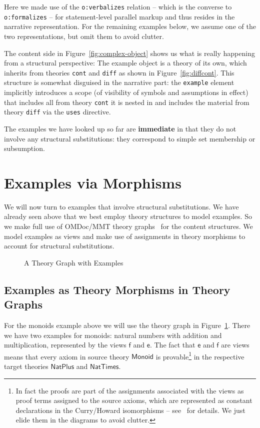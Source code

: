 \documentclass[11pt]{bluenote}
\def\cn#1{\mathsf{#1}}
\def\omdoc{OMDoc\xspace}
\def\omdoc{OMDoc\xspace}
\def\defemph{\textbf}
\begin{document}
Here we made use of the \lstinline|o:verbalizes| relation
-- which is the converse to \lstinline|o:formalizes| -- for statement-level parallel
markup and thus resides in the narrative representation. For the remaining examples below,
we assume one of the two representations, but omit them to avoid clutter.

The content side in Figure~\ref{fig:complex-object} shows us what is really happening from
a structural perspective: The example object is a theory of its own, which inherits from
theories \lstinline|cont| and \lstinline|diff| as shown in Figure~\ref{fig:diffcont}. This
structure is somewhat disguised in the narrative part: the \lstinline|example| element
implicitly introduces a scope (of visibility of symbols and assumptions in effect) that
includes all from theory \lstinline|cont| it is nested in and includes the material from
theory \lstinline|diff| via the \lstinline|uses| directive.

The examples we have looked up so far are \defemph{immediate} in that they do not involve
any structural substitutions: they correspond to simple set membership or subsumption.


\section{Examples via Morphisms}\label{sec:thygraph}

We will now turn to examples that involve structural substitutions. We have already seen
above that we best employ theory structures to model examples. So we make full use of
\omdoc/MMT theory graphs~\cite{RabKoh:WSMSML13} for the content structures. We model
examples as views and make use of assignments in theory morphisms to account for
structural substitutions.

\begin{figure}[ht]\centering
\providecommand\myxscale{4.3}
\providecommand\myyscale{2.5}
\caption{A Theory Graph with Examples}\label{fig:elal}
\end{figure}

\subsection{Examples as Theory Morphisms in Theory Graphs}

For the monoids example above we will use the theory graph in Figure~\ref{fig:elal}.
There we have two examples for monoids: natural numbers with addition and multiplication,
represented by the views $\cn{f}$ and $\cn{e}$. The fact that $\cn{e}$ and $\cn{f}$ are
views means that every axiom in source theory $\cn{Monoid}$ is provable\footnote{In fact
  the proofs are part of the assignments associated with the views as proof terms assigned
  to the source axioms, which are represented as constant declarations in the Curry/Howard
  isomorphisms -- see~\cite{RabKoh:WSMSML13} for details. We just elide them in the
  diagrams to avoid clutter. } in the respective target theories $\cn{NatPlus}$ and
$\cn{NatTimes}$.
\end{document}
